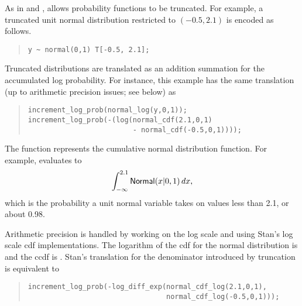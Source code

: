 As in \BUGS and \JAGS, \Stan allows probability functions to be
truncated.  For example, a truncated unit normal distribution
restricted to $(-0.5, 2.1)$ is encoded as follows.
%
\begin{quote}
\begin{Verbatim}[fontsize=\small]
y ~ normal(0,1) T[-0.5, 2.1];
\end{Verbatim}
\end{quote}
% 
Truncated distributions are translated as an addition summation for
the accumulated log probability.  For instance, this example has the
same translation (up to arithmetic precision issues; see below) as
%
\begin{quote}
\begin{Verbatim}[fontsize=\small]
increment_log_prob(normal_log(y,0,1));
increment_log_prob(-(log(normal_cdf(2.1,0,1)
                         - normal_cdf(-0.5,0,1))));
\end{Verbatim}
\end{quote}
%
The function  represents the cumulative normal
distribution function.  For example,  evaluates to 
\[
\int_{-\infty}^{2.1} \mbox{\sf Normal}(x|0,1) \, dx,
\]
%
which is the probability a unit normal variable takes on values less
than 2.1, or about 0.98.  

Arithmetic precision is handled by working on the log scale and using
Stan's log scale cdf implementations.  The logarithm of the cdf for
the normal distribution is  and the ccdf is
.  Stan's translation for the denominator
introduced by truncation is equivalent to
%
\begin{quote}
\begin{Verbatim}
increment_log_prob(-log_diff_exp(normal_cdf_log(2.1,0,1),
                                 normal_cdf_log(-0.5,0,1)));
\end{Verbatim}
\end{quote}
%

